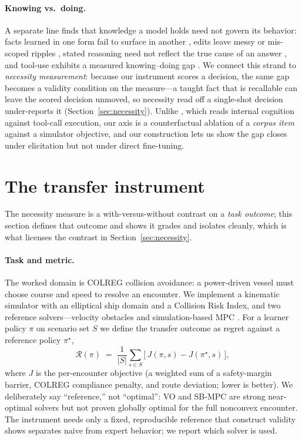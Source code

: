 \documentclass{article}
\newcommand{\regret}{\mathcal{R}}
\begin{document}
\paragraph{Knowing vs.\ doing.} A separate line finds that knowledge a model holds need not govern its
behavior: facts learned in one form fail to surface in another \citep{reversalcurse2023}, edits leave
messy or mis-scoped ripples \citep{rippleedits2024}, stated reasoning need not reflect the true cause of
an answer \citep{turpin2023cot}, and tool-use exhibits a measured knowing--doing gap
\citep{knowingdoing2026}. We connect this strand to \emph{necessity measurement}: because our instrument
scores a decision, the same gap becomes a validity condition on the measure---a taught fact that is
recallable can leave the scored decision unmoved, so necessity read off a single-shot decision
under-reports it (Section~\ref{sec:necessity}). Unlike \citet{knowingdoing2026}, which reads internal
cognition against tool-call execution, our axis is a counterfactual ablation of a \emph{corpus item}
against a simulator objective, and our construction lets us show the gap closes under elicitation but
not under direct fine-tuning.

\section{The transfer instrument}
\label{sec:instrument}
The necessity measure is a with-versus-without contrast on a \emph{task outcome}; this section defines
that outcome and shows it grades and isolates cleanly, which is what licenses the contrast in
Section~\ref{sec:necessity}.

\paragraph{Task and metric.} The worked domain is COLREG collision avoidance: a power-driven vessel
must choose course and speed to resolve an encounter. We implement a kinematic simulator with an
elliptical ship domain and a Collision Risk Index, and two reference solvers---velocity obstacles
\citep{fiorini1998vo} and simulation-based MPC \citep{johansen2016sbmpc}. For a learner policy $\pi$ on
scenario set $S$ we define the transfer outcome as regret against a reference policy $\pi^\star$,
\begin{equation}
  \regret(\pi) \;=\; \frac{1}{|S|}\sum_{s \in S}\big[\, J(\pi, s) - J(\pi^\star, s)\,\big],
\end{equation}
where $J$ is the per-encounter objective (a weighted sum of a safety-margin barrier, COLREG
compliance penalty, and route deviation; lower is better). We deliberately say ``reference,'' not
``optimal'': VO and SB-MPC are strong near-optimal solvers but not proven globally optimal for the full
nonconvex encounter. The instrument needs only a fixed, reproducible reference that construct validity
shows separates naive from expert behavior; we report which solver is used.
\end{document}
